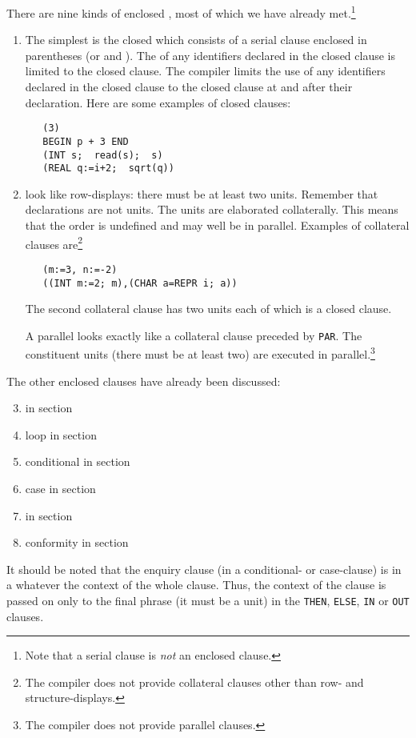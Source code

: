 There are nine kinds of enclosed , most
of which we have already met.\footnote{Note that a serial clause is
\protect\emph{not} an enclosed clause.}
\begin{enumerate}
\item The simplest is the closed  which
consists of a serial clause enclosed in parentheses (or 
and ).  The  of any identifiers declared in the
closed clause is limited to the closed clause.  The
 compiler limits the use of any
identifiers declared in the closed clause to the closed clause at and
after their declaration.  Here are some examples of closed clauses:
\begin{verbatim}
   (3)
   BEGIN p + 3 END
   (INT s;  read(s);  s)
   (REAL q:=i+2;  sqrt(q))
\end{verbatim}
\noindent
\item {} look like
row-displays: there must be at least two units. Remember that
declarations are not units.  The units are elaborated collaterally.
This means that the order is undefined and may well be in parallel.
Examples of collateral clauses are\footnote{The
\protect{}
compiler does not provide collateral clauses other than row-
and structure-displays.}
\begin{verbatim}
   (m:=3, n:=-2)
   ((INT m:=2; m),(CHAR a=REPR i; a))
\end{verbatim}
\noindent
The second collateral clause has two units each of which is a
closed clause.

A parallel  looks exactly like a
collateral clause preceded by \verb|PAR|. The constituent units
(there must be at least two) are executed in parallel.\footnote{The
\protect{} compiler does not
provide parallel clauses.}
\end{enumerate}
The other enclosed clauses have already been discussed: 
\begin{enumerate}\setcounter{enumi}{2}
\item {} in section~
\item loop  in section 
\item conditional  in section
\item case  in section 
\item {} in
section~
\item conformity  in
section~
\end{enumerate}
It should be noted that the enquiry clause (in a conditional- or
case-clause) is in a  whatever the
context of the whole clause. Thus, the context of the clause is
passed on only to the final phrase (it must be a unit) in the
\verb|THEN|, \verb|ELSE|, \verb|IN| or \verb|OUT| clauses.

